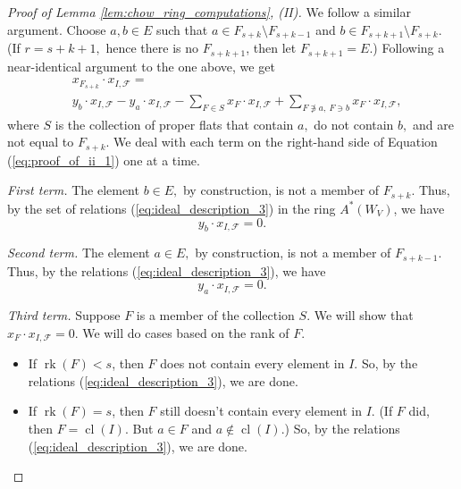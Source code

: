 \documentclass{amsart}
\theoremstyle{plain}
\theoremstyle{definition}
\newcommand{\rk}{\operatorname{rk}}
\newcommand{\cl}{\operatorname{cl}}
\begin{document}
\begin{proof}[Proof of Lemma \ref{lem:chow_ring_computations}, (II)]  
We follow a similar argument. Choose $a,b \in E$ such that $a \in F_{s+k} \setminus F_{s+k-1}$ and $b \in F_{s+k+1} \setminus F_{s+k}.$ (If $r=s+ k+1,$ hence there is no $F_{s+k+1}$, then let $F_{s+k+1} = E.$) Following a near-identical argument to the one above,
we get 
\begin{equation}
\label{eq:proof_of_ii_1}
\begin{split}
& x_{F_{s+k}} \cdot x_{I , \mathscr{F}} = \\ & y_b \cdot x_{I , \mathscr{F}} - y_a \cdot x_{I , \mathscr{F}}  - \sum_{F \in S}x_F \cdot x_{I , \mathscr{F}}  + \sum_{F \not\ni a,\: F \ni b}x_F \cdot x_{I , \mathscr{F}},
\end{split}
\end{equation}
where $S$ is the collection of proper flats that contain $a,$ do not contain $b,$ and are not equal to $F_{s+k}.$ We deal with each term on the right-hand side of Equation (\ref{eq:proof_of_ii_1}) one at a time.

\noindent
\textit{First term.} The element $b\in E,$ by construction, is not a member of $F_{s+k}$. Thus, by the set of relations (\ref{eq:ideal_description_3}) in the ring $A^*(W_V)$, we have
\begin{equation*}
y_b \cdot x_{I, \mathscr{F}} = 0.
\end{equation*}

\noindent
\textit{Second term.} The element $a\in E,$ by construction, is not a member of $F_{s+k-1}$. Thus, by the relations (\ref{eq:ideal_description_3}), we have
\begin{equation*}
y_a \cdot x_{I, \mathscr{F}} = 0. 
\end{equation*}

\noindent
\textit{Third term.} Suppose $F$ is a member of the collection $S$. We will show that $x_F \cdot x_{I , \mathscr{F}} = 0$. We will do cases based on the rank of $F$.
\begin{itemize}

\item If $\rk(F) < s$, then $F$ does not contain every element in $I$. So, by the relations (\ref{eq:ideal_description_3}), we are done.

\item If $\rk(F) = s$, then $F$ still doesn't contain every element in $I$. (If $F$ did, then $F = \cl(I)$. But $a\in F$ and $a \notin \cl(I)$.) So, by the relations (\ref{eq:ideal_description_3}), we are done.


\end{itemize}
\end{proof}
\end{document}
